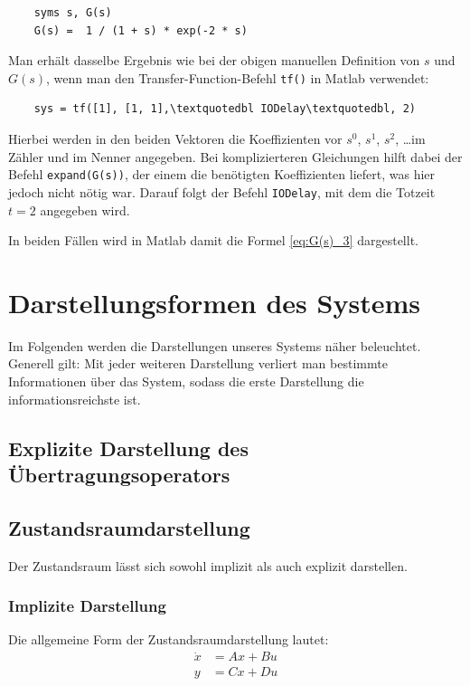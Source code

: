\begin{verbatim}
    syms s, G(s)
    G(s) =  1 / (1 + s) * exp(-2 * s)
\end{verbatim}

Man erhält dasselbe Ergebnis wie bei der obigen manuellen Definition von $s$ und $G(s)$, wenn man den Transfer-Function-Befehl \texttt{tf()} in Matlab verwendet:

\begin{verbatim}
    sys = tf([1], [1, 1],\textquotedbl IODelay\textquotedbl, 2)
\end{verbatim}

Hierbei werden in den beiden Vektoren die Koeffizienten vor $s^0$, $s^1$, $s^2$, \ldots im Zähler und im Nenner angegeben. Bei komplizierteren Gleichungen hilft dabei der Befehl \texttt{expand(G(s))}, der einem die benötigten Koeffizienten liefert, was hier jedoch nicht nötig war. Darauf folgt der Befehl \texttt{\textquotedbl IODelay\textquotedbl}, mit dem die Totzeit $t = 2$ angegeben wird.

In beiden Fällen wird in Matlab damit die Formel \ref{eq:G(s)_3} dargestellt.

\section{Darstellungsformen des Systems}
Im Folgenden werden die Darstellungen unseres Systems näher beleuchtet. Generell gilt: Mit jeder weiteren Darstellung verliert man bestimmte Informationen über das System, sodass die erste Darstellung die informationsreichste ist.

\subsection{Explizite Darstellung des Übertragungsoperators}

\subsection{Zustandsraumdarstellung}
Der Zustandsraum lässt sich sowohl implizit als auch explizit darstellen.

\subsubsection{Implizite Darstellung}

Die allgemeine Form der Zustandsraumdarstellung lautet:
\begin{align*}
    \dot x & = Ax + Bu \nonumber \\
    y & = Cx + Du
\end{align*}

